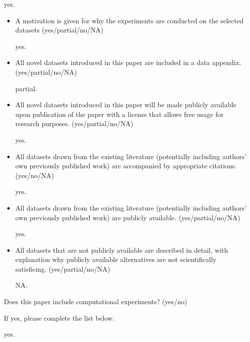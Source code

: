 yes.

\begin{itemize}
\item A motivation is given for why the experiments are conducted on the selected datasets (yes/partial/no/NA)

yes.

\item All novel datasets introduced in this paper are included in a data appendix. (yes/partial/no/NA)

partial.

\item All novel datasets introduced in this paper will be made publicly available upon publication of the paper with a license that allows free usage for research purposes. (yes/partial/no/NA)

yes.

\item All datasets drawn from the existing literature (potentially including authors’ own previously published work) are accompanied by appropriate citations. (yes/no/NA)

yes.

\item All datasets drawn from the existing literature (potentially including authors’ own previously published work) are publicly available. (yes/partial/no/NA)

yes.

\item All datasets that are not publicly available are described in detail, with explanation why publicly available alternatives are not scientifically satisficing. (yes/partial/no/NA)

NA.

\end{itemize}

\noindent Does this paper include computational experiments? (yes/no)

\noindent If yes, please complete the list below.

yes.

